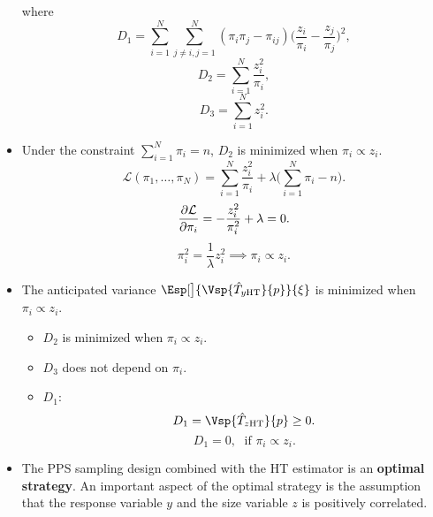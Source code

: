 \begin{itemize}
            where
            \[ D_1=\sum_{i=1}^{N}\sum_{j\ne i,j=1}^{N}(\pi_i\pi_j-\pi_{ij})\biggl(\frac{z_i}{\pi_i}-\frac{z_j}{\pi_j}\biggr)^{\!2}, \]
            \[ D_2=\sum_{i=1}^{N}\frac{z_i^2}{\pi_i}, \]
            \[ D_3=\sum_{i=1}^{N}z_i^2. \]
      \item Under the constraint $ \sum_{i=1}^{N}\pi_i=n $, $ D_2 $ is minimized when $ \pi_i\propto z_i $.
            \[ \mathcal{L}(\pi_1,\ldots,\pi_N)=\sum_{i=1}^{N}\frac{z_i^2}{\pi_i}+\lambda\biggl(\sum_{i=1}^{N}\pi_i-n\biggr). \]
            \[ \pdv{\mathcal{L}}{\pi_i}=-\frac{z_i^2}{\pi_i^2}+\lambda=0. \]
            \[ \pi_i^2=\frac{1}{\lambda}z_i^2\implies \pi_i\propto z_i. \]
      \item The anticipated variance $ \Esp[\big]{\Vsp{\hat{T}_{y\HT}}{p}}{\xi} $ is minimized when $ \pi_i\propto z_i $.
            \begin{itemize}
                  \item $ D_2 $ is minimized when $ \pi_i\propto z_i $.
                  \item $ D_3 $ does not depend on $ \pi_i $.
                  \item $ D_1 $:
                        \[ D_1=\Vsp{\hat{T}_{z\HT}}{p}\ge 0. \]
                        \[ D_1=0,\;\text{ if }\pi_i\propto z_i. \]
            \end{itemize}
      \item The PPS sampling design combined with the HT estimator is an
            \textbf{optimal strategy}. An important aspect of the optimal strategy is
            the assumption that the response variable $y$ and the size variable
            $z$ is positively correlated.
\end{itemize}